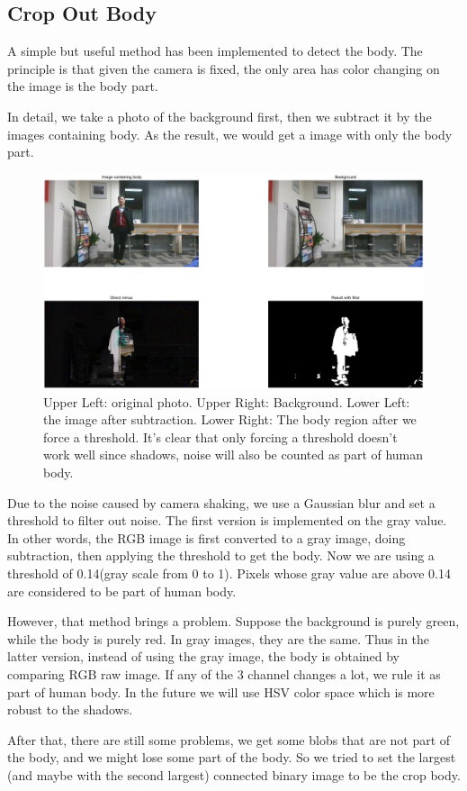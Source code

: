 \documentclass[conference,compsoc]{IEEEtran}
\begin{document}
	\subsection{Crop Out Body}
	\par
	A simple but useful method has been implemented to detect the body. The principle is that given the camera is fixed, the only area has color changing on the image is the body part.
	\par
	In detail, we take a photo of the background first, then we subtract it by the images containing body. As the result, we would get a image with only the body part.
	\begin{figure}[h]
		\centering
		\includegraphics[width=\linewidth]{./Pic/CropBody.png}
		\caption{Upper Left: original photo. Upper Right: Background. Lower Left: the image after subtraction. Lower Right: The body region after we force a threshold. It's clear that only forcing a threshold doesn't work well since shadows, noise will also be counted as part of human body.}
	\end{figure}
	\par
		Due to the noise caused by camera shaking, we use a Gaussian blur and set a threshold to filter out noise.
		The first version is implemented on the gray value. In other words, the RGB image is first converted to a gray image, doing subtraction, then applying the threshold to get the body.
		Now we are using a threshold of 0.14(gray scale from 0 to 1).
		Pixels whose gray value are above 0.14 are considered to be part of human body.
	\par
		However, that method brings a problem. Suppose the background is purely green, while the body is purely red.
		In gray images, they are the same.
		Thus in the latter version, instead of using the gray image, the body is obtained by comparing RGB raw image.
		If any of the 3 channel changes a lot, we rule it as part of human body.
		In the future we will use HSV color space which is more robust to the shadows.
	\par
		After that, there are still some problems, we get some blobs that are not part of the body, and we might lose some part of the body. So we tried to set the largest (and maybe with the second largest) connected binary image to be the crop body.
\end{document}
